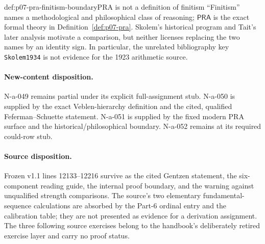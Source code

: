 \begin{hbwarning}{def:p07-pra-finitism-boundary}{PRA is not a definition of finitism}
``Finitism'' names a methodological and philosophical class of reasoning;
\(\mathsf{PRA}\) is the exact formal theory in
Definition~\ref{def:p07-pra}.  Skolem's historical program and Tait's later
analysis motivate a comparison, but neither licenses replacing the two names
by an identity sign.  In particular, the unrelated bibliography key
\texttt{Skolem1934} is not evidence for the 1923 arithmetic source.
\end{hbwarning}


\paragraph{New-content disposition.}
N-a-049 remains partial under its explicit full-assignment stub.  N-a-050 is
supplied by the exact Veblen-hierarchy definition and the cited, qualified
Feferman--Schuette statement.  N-a-051 is supplied by the fixed modern PRA
surface and the historical/philosophical boundary.  N-a-052 remains at its
required could-row stub.

\paragraph{Source disposition.}
Frozen v1.1 lines 12133--12216 survive as the cited Gentzen statement, the
six-component reading guide, the internal proof boundary, and the warning
against unqualified strength comparisons.  The source's two elementary
fundamental-sequence calculations are absorbed by the Part-6 ordinal entry
and the calibration table; they are not presented as evidence for a
derivation assignment.  The three following source exercises belong to the
handbook's deliberately retired exercise layer and carry no proof status.
